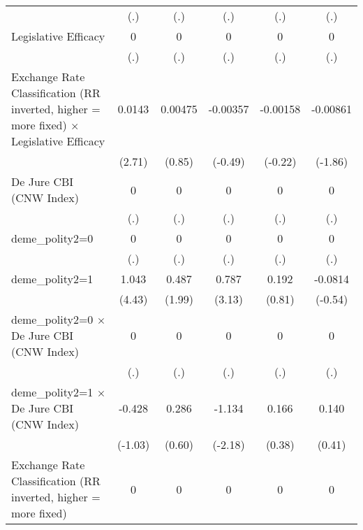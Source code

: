 {\begin{tabular*}{\linewidth}{@{\hskip\tabcolsep\extracolsep\fill}l*{5}{c}}
                &      (.)         &      (.)         &      (.)         &      (.)         &      (.)         \\
[1em]
Legislative Efficacy&        0         &        0         &        0         &        0         &        0         \\
                &      (.)         &      (.)         &      (.)         &      (.)         &      (.)         \\
[1em]
Exchange Rate Classification (RR inverted, higher = more fixed) $\times$ Legislative Efficacy&   0.0143\sym{**} &  0.00475         & -0.00357         & -0.00158         & -0.00861         \\
                &   (2.71)         &   (0.85)         &  (-0.49)         &  (-0.22)         &  (-1.86)         \\
[1em]
De Jure CBI (CNW Index)&        0         &        0         &        0         &        0         &        0         \\
                &      (.)         &      (.)         &      (.)         &      (.)         &      (.)         \\
[1em]
deme\_polity2=0  &        0         &        0         &        0         &        0         &        0         \\
                &      (.)         &      (.)         &      (.)         &      (.)         &      (.)         \\
[1em]
deme\_polity2=1  &    1.043\sym{***}&    0.487\sym{*}  &    0.787\sym{**} &    0.192         &  -0.0814         \\
                &   (4.43)         &   (1.99)         &   (3.13)         &   (0.81)         &  (-0.54)         \\
[1em]
deme\_polity2=0 $\times$ De Jure CBI (CNW Index)&        0         &        0         &        0         &        0         &        0         \\
                &      (.)         &      (.)         &      (.)         &      (.)         &      (.)         \\
[1em]
deme\_polity2=1 $\times$ De Jure CBI (CNW Index)&   -0.428         &    0.286         &   -1.134\sym{*}  &    0.166         &    0.140         \\
                &  (-1.03)         &   (0.60)         &  (-2.18)         &   (0.38)         &   (0.41)         \\
[1em]
Exchange Rate Classification (RR inverted, higher = more fixed)&        0         &        0         &        0         &        0         &        0         \\

\end{tabular*}}

